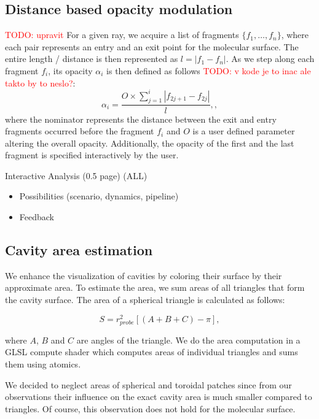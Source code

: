 \subsection{Distance based opacity modulation}
\textcolor{red}{TODO: upravit}
For a given ray, we acquire a list of fragments $\{f_1,\ldots,f_n \}$, where each pair represents an entry and an exit point for the molecular surface. The entire length / distance is then represented as $l=|f_1-f_n|$. As we step along each fragment $f_i$, its opacity $\alpha_i$ is then defined as follows \textcolor{red}{TODO: v kode je to inac ale takto by to neslo?}:
\begin{equation}
  \alpha_i = \frac{O\times\sum_{j=1}^{i}|f_{2j+1}-f_{2j}|}{l},
	\label{eq:alphaDist},
\end{equation}	
	where the nominator represents the distance between the exit and entry fragments occurred before the fragment $f_i$ and $O$ is a user defined parameter altering the overall opacity. Additionally, the opacity of the first and the last fragment is specified interactively by the user.

Interactive Analysis (0.5 page) (ALL)
\begin{itemize}
  \item Possibilities (scenario, dynamics, pipeline)
  \item Feedback
\end{itemize}

\subsection{Cavity area estimation}

We enhance the visualization of cavities by coloring their surface by their approximate area.
To estimate the area, we sum areas of all triangles that form the cavity surface.
The area of a spherical triangle is calculated as follows:

\begin{equation}
  S = r_{probe}^2 \left[ \left( A + B + C \right) - \pi \right],
\end{equation}

where $A$, $B$ and $C$ are angles of the triangle. We do the area computation in a GLSL compute shader which computes areas of individual triangles and sums them using atomics.

We decided to neglect areas of spherical and toroidal patches since from our observations their influence on the exact cavity area is much smaller compared to triangles.
Of course, this observation does not hold for the molecular surface.
